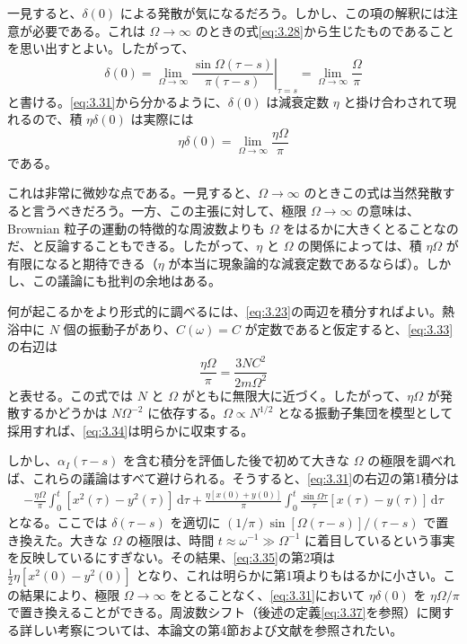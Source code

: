 一見すると、$\delta(0)$ による発散が気になるだろう。しかし、この項の解釈には注意が必要である。これは $\Omega\to\infty$ のときの式\eqref{eq:3.28}から生じたものであることを思い出すとよい。したがって、
\begin{equation}
\delta(0)=\lim_{\Omega\to\infty}
\left.\frac{\sin\Omega(\tau-s)}{\pi(\tau-s)}\right|_{\tau=s}
=\lim_{\Omega\to\infty}\frac{\Omega}{\pi}
\tag{3.32}\label{eq:3.32}
\end{equation}
と書ける。\eqref{eq:3.31}から分かるように、$\delta(0)$ は減衰定数 $\eta$ と掛け合わされて現れるので、積 $\eta\delta(0)$ は実際には
\begin{equation}
\eta\delta(0)=\lim_{\Omega\to\infty}\frac{\eta\Omega}{\pi}
\tag{3.33}\label{eq:3.33}
\end{equation}
である。

これは非常に微妙な点である。一見すると、$\Omega\to\infty$ のときこの式は当然発散すると言うべきだろう。一方、この主張に対して、極限 $\Omega\to\infty$ の意味は、Brownian 粒子の運動の特徴的な周波数よりも $\Omega$ をはるかに大きくとることなのだ、と反論することもできる。したがって、$\eta$ と $\Omega$ の関係によっては、積 $\eta\Omega$ が有限になると期待できる（$\eta$ が本当に現象論的な減衰定数であるならば）。しかし、この議論にも批判の余地はある。

何が起こるかをより形式的に調べるには、\eqref{eq:3.23}の両辺を積分すればよい。熱浴中に $N$ 個の振動子があり、$C(\omega)=C$ が定数であると仮定すると、\eqref{eq:3.33}の右辺は
\begin{equation}
\frac{\eta\Omega}{\pi}=\frac{3NC^2}{2m\Omega^2}
\tag{3.34}\label{eq:3.34}
\end{equation}
と表せる。この式では $N$ と $\Omega$ がともに無限大に近づく。したがって、$\eta\Omega$ が発散するかどうかは $N\Omega^{-2}$ に依存する。$\Omega\propto N^{1/2}$ となる振動子集団を模型として採用すれば、\eqref{eq:3.34}は明らかに収束する。

しかし、$\alpha_I(\tau-s)$ を含む積分を評価した後で初めて大きな $\Omega$ の極限を調べれば、これらの議論はすべて避けられる。そうすると、\eqref{eq:3.31}の右辺の第1積分は
\begin{equation}
\begin{aligned}
-\frac{\eta\Omega}{\pi}\int_0^t[x^2(\tau)-y^2(\tau)]\,\mathrm d\tau
+\frac{\eta[x(0)+y(0)]}{\pi}
\int_0^t\frac{\sin\Omega\tau}{\tau}[x(\tau)-y(\tau)]\,\mathrm d\tau
\end{aligned}
\tag{3.35}\label{eq:3.35}
\end{equation}
となる。ここでは $\delta(\tau-s)$ を適切に $(1/\pi)\sin[\Omega(\tau-s)]/(\tau-s)$ で置き換えた。大きな $\Omega$ の極限は、時間 $t\approx\omega^{-1}\gg\Omega^{-1}$ に着目しているという事実を反映しているにすぎない。その結果、\eqref{eq:3.35}の第2項は $\frac12\eta[x^2(0)-y^2(0)]$ となり、これは明らかに第1項よりもはるかに小さい。この結果により、極限 $\Omega\to\infty$ をとることなく、\eqref{eq:3.31}において $\eta\delta(0)$ を $\eta\Omega/\pi$ で置き換えることができる。周波数シフト（後述の定義\eqref{eq:3.37}を参照）に関する詳しい考察については、本論文の第4節および文献\cite{ref21}を参照されたい。

